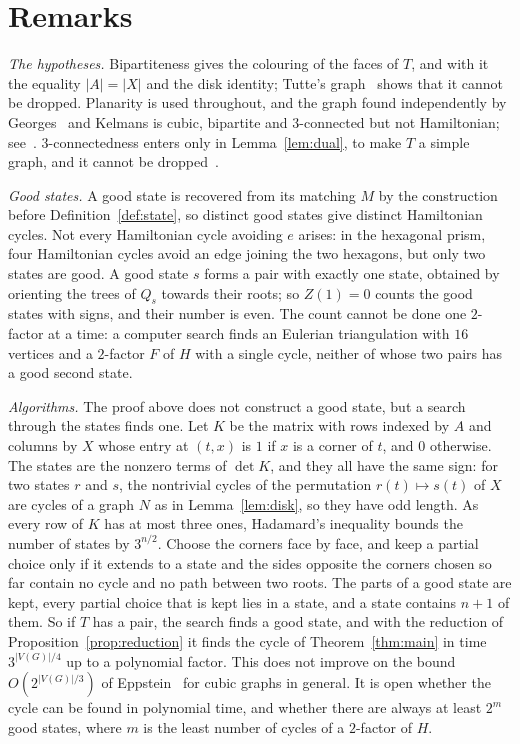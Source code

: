 \documentclass[a4paper]{amsart}
\numberwithin{equation}{section}
\theoremstyle{definition}
\begin{document}
\section{Remarks}\label{sec:remarks}

\emph{The hypotheses.}
Bipartiteness gives the colouring of the faces of $T$, and with it the equality $|A|=|X|$ and the disk identity; Tutte's graph~\cite{Tutte} shows that it cannot be dropped.
Planarity is used throughout, and the graph found independently by Georges~\cite{Georges} and Kelmans is cubic, bipartite and $3$-connected but not Hamiltonian; see~\cite{BGM}.
$3$-connectedness enters only in Lemma~\ref{lem:dual}, to make $T$ a simple graph, and it cannot be dropped~\cite{AEHS}.

\emph{Good states.}
A good state is recovered from its matching $M$ by the construction before Definition~\ref{def:state}, so distinct good states give distinct Hamiltonian cycles.
Not every Hamiltonian cycle avoiding $e$ arises: in the hexagonal prism, four Hamiltonian cycles avoid an edge joining the two hexagons, but only two states are good.
A good state $s$ forms a pair with exactly one state, obtained by orienting the trees of $Q_s$ towards their roots; so $Z(1)=0$ counts the good states with signs, and their number is even.
The count cannot be done one $2$-factor at a time: a computer search finds an Eulerian triangulation with $16$ vertices and a $2$-factor $F$ of $H$ with a single cycle, neither of whose two pairs has a good second state.

\emph{Algorithms.}
The proof above does not construct a good state, but a search through the states finds one.
Let $K$ be the matrix with rows indexed by $A$ and columns by $X$ whose entry at $(t,x)$ is $1$ if $x$ is a corner of $t$, and $0$ otherwise.
The states are the nonzero terms of $\det K$, and they all have the same sign: for two states $r$ and $s$, the nontrivial cycles of the permutation $r(t)\mapsto s(t)$ of $X$ are cycles of a graph $N$ as in Lemma~\ref{lem:disk}, so they have odd length.
As every row of $K$ has at most three ones, Hadamard's inequality bounds the number of states by $3^{n/2}$.
Choose the corners face by face, and keep a partial choice only if it extends to a state and the sides opposite the corners chosen so far contain no cycle and no path between two roots.
The parts of a good state are kept, every partial choice that is kept lies in a state, and a state contains $n+1$ of them.
So if $T$ has a pair, the search finds a good state, and with the reduction of Proposition~\ref{prop:reduction} it finds the cycle of Theorem~\ref{thm:main} in time $3^{|V(G)|/4}$ up to a polynomial factor.
This does not improve on the bound $O(2^{|V(G)|/3})$ of Eppstein~\cite{Eppstein} for cubic graphs in general.
It is open whether the cycle can be found in polynomial time, and whether there are always at least $2^m$ good states, where $m$ is the least number of cycles of a $2$-factor of $H$.
\end{document}

